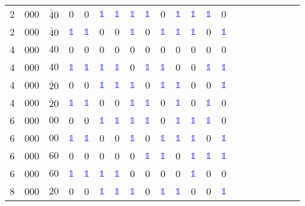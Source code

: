 \begin{longtable*}{c| cccccccccccccccccccc }
 2& 000& $\bar{4}0$& 0& 0& \textcolor{blue}{$\mathds{1}$}& \textcolor{blue}{$\mathds{1}$}& \textcolor{blue}{$\mathds{1}$}& \textcolor{blue}{$\mathds{1}$}& 0& \textcolor{blue}{$\mathds{1}$}& \textcolor{blue}{$\mathds{1}$}& \textcolor{blue}{$\mathds{1}$}& 0\\
 2& 000& $\bar{4}0$& \textcolor{blue}{$\mathds{1}$}& \textcolor{blue}{$\mathds{1}$}& 0& 0& \textcolor{blue}{$\mathds{1}$}& 0& \textcolor{blue}{$\mathds{1}$}& \textcolor{blue}{$\mathds{1}$}& \textcolor{blue}{$\mathds{1}$}& 0& \textcolor{blue}{$\mathds{1}$}\\
 4& 000& $40$& 0& 0& 0& 0& 0& 0& 0& 0& 0& 0& 0\\
 4& 000& $40$& \textcolor{blue}{$\mathds{1}$}& \textcolor{blue}{$\mathds{1}$}& \textcolor{blue}{$\mathds{1}$}& \textcolor{blue}{$\mathds{1}$}& 0& \textcolor{blue}{$\mathds{1}$}& \textcolor{blue}{$\mathds{1}$}& 0& 0& \textcolor{blue}{$\mathds{1}$}& \textcolor{blue}{$\mathds{1}$}\\
 4& 000& $\bar{2}0$& 0& 0& \textcolor{blue}{$\mathds{1}$}& \textcolor{blue}{$\mathds{1}$}& \textcolor{blue}{$\mathds{1}$}& 0& \textcolor{blue}{$\mathds{1}$}& \textcolor{blue}{$\mathds{1}$}& 0& 0& \textcolor{blue}{$\mathds{1}$}\\
 4& 000& $\bar{2}0$& \textcolor{blue}{$\mathds{1}$}& \textcolor{blue}{$\mathds{1}$}& 0& 0& \textcolor{blue}{$\mathds{1}$}& \textcolor{blue}{$\mathds{1}$}& 0& \textcolor{blue}{$\mathds{1}$}& 0& \textcolor{blue}{$\mathds{1}$}& 0\\
 6& 000& $00$& 0& 0& \textcolor{blue}{$\mathds{1}$}& \textcolor{blue}{$\mathds{1}$}& \textcolor{blue}{$\mathds{1}$}& \textcolor{blue}{$\mathds{1}$}& 0& \textcolor{blue}{$\mathds{1}$}& \textcolor{blue}{$\mathds{1}$}& \textcolor{blue}{$\mathds{1}$}& 0\\
 6& 000& $00$& \textcolor{blue}{$\mathds{1}$}& \textcolor{blue}{$\mathds{1}$}& 0& 0& \textcolor{blue}{$\mathds{1}$}& 0& \textcolor{blue}{$\mathds{1}$}& \textcolor{blue}{$\mathds{1}$}& \textcolor{blue}{$\mathds{1}$}& 0& \textcolor{blue}{$\mathds{1}$}\\
 6& 000& $60$& 0& 0& 0& 0& 0& \textcolor{blue}{$\mathds{1}$}& \textcolor{blue}{$\mathds{1}$}& 0& \textcolor{blue}{$\mathds{1}$}& \textcolor{blue}{$\mathds{1}$}& \textcolor{blue}{$\mathds{1}$}\\
 6& 000& $60$& \textcolor{blue}{$\mathds{1}$}& \textcolor{blue}{$\mathds{1}$}& \textcolor{blue}{$\mathds{1}$}& \textcolor{blue}{$\mathds{1}$}& 0& 0& 0& 0& \textcolor{blue}{$\mathds{1}$}& 0& 0\\
 8& 000& $20$& 0& 0& \textcolor{blue}{$\mathds{1}$}& \textcolor{blue}{$\mathds{1}$}& \textcolor{blue}{$\mathds{1}$}& 0& \textcolor{blue}{$\mathds{1}$}& \textcolor{blue}{$\mathds{1}$}& 0& 0& \textcolor{blue}{$\mathds{1}$}\\

\end{longtable*}

